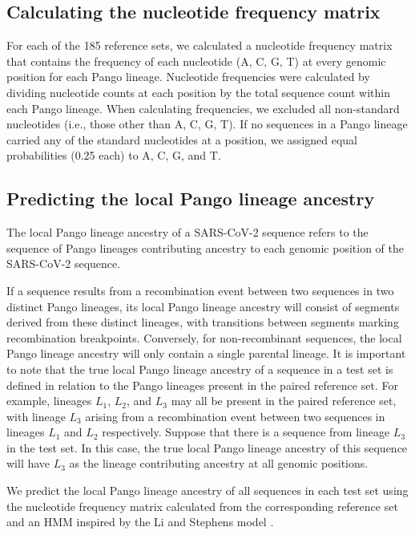\documentclass[11pt,oneside,letterpaper]{article}
\begin{document}
\subsection{Calculating the nucleotide frequency matrix}\label{subsec:freq_matrix}

For each of the 185 reference sets, we calculated a nucleotide frequency matrix that contains the frequency of each nucleotide (A, C, G, T) at every genomic position for each Pango lineage. Nucleotide frequencies were calculated by dividing nucleotide counts at each position by the total sequence count within each Pango lineage.  When calculating frequencies, we excluded all non-standard nucleotides (i.e., those other than A, C, G, T). If no sequences in a Pango lineage carried any of the standard nucleotides at a position, we assigned equal probabilities (0.25 each) to A, C, G, and T.

\subsection{Predicting the local Pango lineage ancestry}

The local Pango lineage ancestry of a SARS-CoV-2 sequence refers to the sequence of Pango lineages contributing ancestry to each genomic position of the SARS-CoV-2 sequence. 

If a sequence results from a recombination event between two sequences in two distinct Pango lineages, its local Pango lineage ancestry will consist of segments derived from these distinct lineages, with transitions between segments marking recombination breakpoints. Conversely, for non-recombinant sequences, the local Pango lineage ancestry will only contain a single parental lineage. It is important to note that the true local Pango lineage ancestry of a sequence in a test set is defined in relation to the Pango lineages present in the paired reference set. For example, lineages $L_1$, $L_2$, and $L_3$ may all be present in the paired reference set, with lineage $L_3$ arising from a recombination event between two sequences in lineages $L_1$ and $L_2$ respectively. Suppose that there is a sequence from lineage $L_3$ in the test set. In this case, the true local Pango lineage ancestry of this sequence will have $L_3$ as the lineage contributing ancestry at all genomic positions. 

We predict the local Pango lineage ancestry of all sequences in each test set using the nucleotide frequency matrix calculated from the corresponding reference set and an HMM inspired by the Li and Stephens model \cite{li_modeling_2003}.
\end{document}
